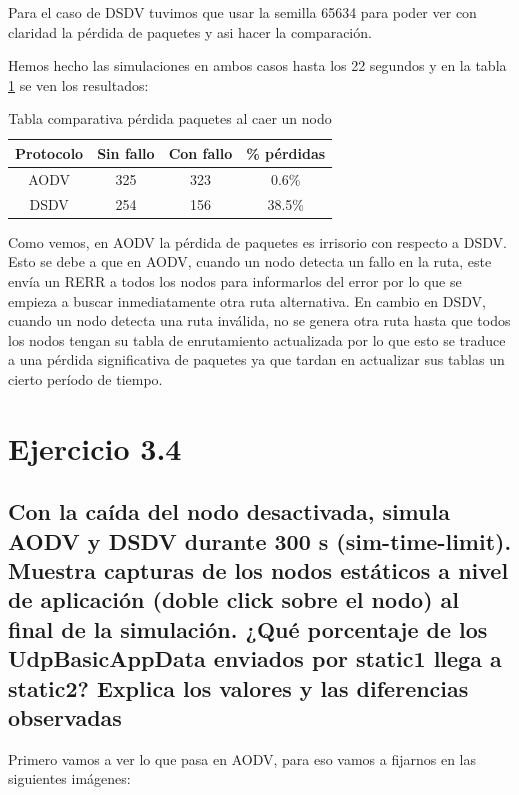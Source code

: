Para el caso de DSDV tuvimos que usar la semilla 65634 para poder ver con claridad la pérdida de paquetes y asi hacer la comparación.

Hemos hecho las simulaciones en ambos casos hasta los 22 segundos y en la tabla \ref{tabla1} se ven los resultados:

\begin{table}[H]
    \centering
    \begin{tabular}{|c|c|c|c|}
    \hline
    Protocolo & Sin fallo & Con fallo & \% pérdidas \\ \hline
      AODV    &   325     &   323     &     0.6\%   \\ \hline
      DSDV    &   254     &   156     &     38.5\%  \\ \hline
    \end{tabular}
    \caption{Tabla comparativa pérdida paquetes al caer un nodo}
    \label{tabla1}
\end{table}

Como vemos, en AODV la pérdida de paquetes es irrisorio con respecto a DSDV. Esto se debe a que en AODV, cuando un nodo detecta un fallo en la ruta, este envía un RERR a todos los nodos para informarlos del error por lo que se empieza a buscar inmediatamente otra ruta alternativa. En cambio en DSDV, cuando un nodo detecta una ruta inválida, no se genera otra ruta hasta que todos los nodos tengan su tabla de enrutamiento actualizada por lo que esto se traduce a una pérdida significativa de paquetes ya que tardan en actualizar sus tablas un cierto período de tiempo. 

\section{Ejercicio 3.4}

\subsection{Con la caída del nodo desactivada, simula AODV y DSDV durante 300 s (sim-time-limit). Muestra
capturas de los nodos estáticos a nivel de aplicación (doble click sobre el nodo) al final de la simulación. ¿Qué
porcentaje de los UdpBasicAppData enviados por static1 llega a static2? Explica los valores y las diferencias
observadas}

Primero vamos a ver lo que pasa en AODV, para eso vamos a fijarnos en las siguientes imágenes:

